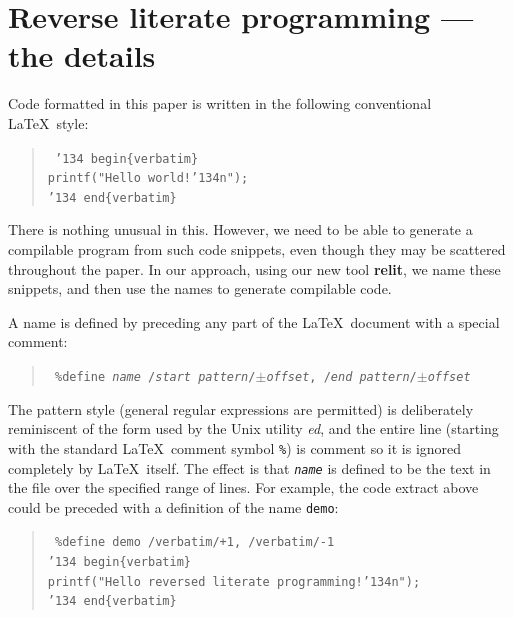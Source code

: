 \documentclass[12pt]{article}
\def\name#1{\textbf{#1}}
\begin{document}
\section{Reverse literate programming --- the details}

Code formatted in this paper is written in the following conventional \LaTeX\ style:

\begin{verse}\tt
\char'134 begin\{verbatim\}\\
printf("Hello world!\char'134n");\\
\char'134 end\{verbatim\}
\end{verse}

There is nothing unusual in this. However, we need to be able to generate a compilable program from such code snippets, even though they may be scattered throughout the paper. In our approach, using our new tool \name{relit}, we name these snippets, and then use the names to generate compilable code.

A name is defined by preceding any part of the \LaTeX\ document with a special comment: 

\begin{verse}\tt
\%{}define \emph{name} /\emph{start pattern}/$\pm$\emph{offset}, /\emph{end pattern}/$\pm$\emph{offset}
\end{verse} 

The pattern style (general regular expressions are permitted) is deliberately reminiscent of the form used by the Unix utility \emph{ed}, and the entire line (starting with the standard \LaTeX\ comment symbol \texttt{\%}) is comment so it is ignored completely by \LaTeX\ itself. 
The effect is that \texttt{\emph{name}} is defined to be the text in the file over the specified range of lines. For example, the code extract above could be preceded with a definition of the name \texttt{demo}:

\begin{verse}\tt %
\%{}define demo /verbatim/+1, /verbatim/-1\\
\char'134 begin\{verbatim\}\\
printf("Hello reversed literate programming!\char'134n");\\
\char'134 end\{verbatim\}
\end{verse}

\def\ignore#1{}
\ignore{
\begin{verbatim}
printf("Hello world!\n");
\end{verbatim}
}
\end{document}
